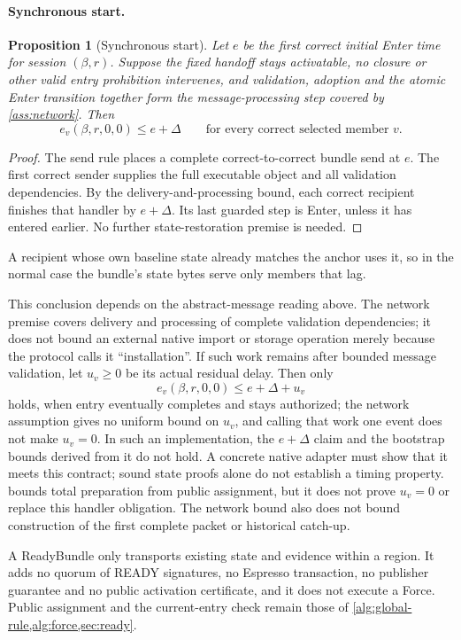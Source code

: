 \documentclass[11pt,a4paper]{article}
\newtheorem{proposition}[proposition]{Proposition}
\newcounter{protocol}
\begin{document}
\paragraph{Synchronous start.}
\begin{proposition}[Synchronous start]
\label{prop:sync-start}
Let $e$ be the first correct initial Enter time for session
$(\beta,r)$. Suppose the fixed handoff stays activatable, no closure or
other valid entry prohibition intervenes, and validation, adoption and
the atomic Enter transition together form the message-processing step
covered by \cref{ass:network}. Then
\[
 e_v(\beta,r,0,0)\le e+\Delta
 \qquad\text{for every correct selected member }v.
\]
\end{proposition}
\begin{proof}
The send rule places a complete correct-to-correct bundle send at $e$.
The first correct sender supplies the full executable object and all
validation dependencies. By the delivery-and-processing bound, each
correct recipient finishes that handler by $e+\Delta$. Its last guarded
step is Enter, unless it has entered earlier. No further
state-restoration premise is needed.
\end{proof}
A recipient whose own baseline state already matches the anchor uses
it, so in the normal case the bundle's state bytes serve only members
that lag.


This conclusion depends on the abstract-message reading above. The
network premise covers delivery and processing of complete validation
dependencies; it does not bound an external native import or storage
operation merely because the protocol calls it ``installation''. If such
work remains after bounded message validation, let $u_v\ge0$ be its
actual residual delay. Then only
\[
 e_v(\beta,r,0,0)\le e+\Delta+u_v
\]
holds, when entry eventually completes and stays authorized; the network
assumption gives no uniform bound on $u_v$, and calling that work one
event does not make $u_v=0$. In such an implementation, the $e+\Delta$
claim and the bootstrap bounds derived from it do not hold. A concrete
native adapter must show that it meets this contract; sound state proofs
alone do not establish a timing property.  bounds
total preparation from public assignment, but it does not prove $u_v=0$
or replace this handler obligation. The network bound also does not
bound construction of the first complete packet or historical catch-up.

A ReadyBundle only transports existing state and evidence within a
region. It adds no quorum of READY signatures, no Espresso transaction,
no publisher guarantee and no public activation certificate, and it does
not execute a Force. Public assignment and the current-entry check remain
those of \cref{alg:global-rule,alg:force,sec:ready}.
\end{document}
